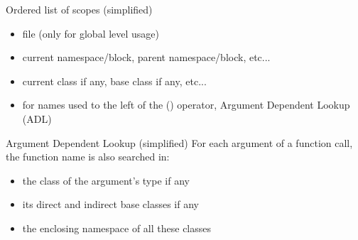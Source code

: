 \begin{frame}
  \begin{block}{Ordered list of scopes (simplified)}
    \begin{itemize}
    \item file (only for global level usage)
    \item current namespace/block, parent namespace/block, etc...
    \item current class if any, base class if any, etc...
    \item for names used to the left of the () operator, Argument Dependent Lookup (ADL)
    \end{itemize}
  \end{block}
  \begin{exampleblock}{Argument Dependent Lookup (simplified)}
    For each argument of a function call, the function name is also searched in:
    \begin{itemize}
    \item the class of the argument's type if any
    \item its direct and indirect base classes if any
    \item the enclosing namespace of all these classes
    \end{itemize}
  \end{exampleblock}
\end{frame}

